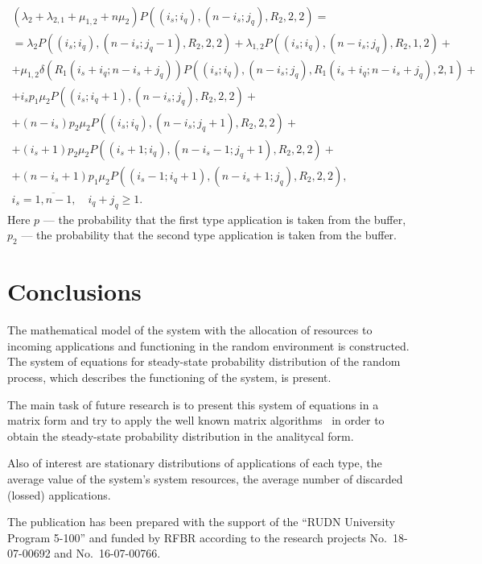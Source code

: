 {\begin{multline}
\label{eq:10.3}
\end{multline}
\begin{multline}
  \left(\lambda_2 +\lambda_{2,1}+\mu_{1,2}+n\mu_2\right)
  P\left((i_s;i_q),(n-i_s;j_q),R_2,2,2\right) = \\ =
  \lambda_2 P\left((i_s;i_q),(n-i_s;j_q-1),R_2,2,2\right) +
  \lambda_{1,2} P\left((i_s;i_q),(n-i_s;j_q),R_2,1,2\right) + \\ +
  \mu_{1,2}  \delta\left(R_1(i_s+i_q; n-i_s+j_q)\right)
  P\left((i_s;i_q),(n-i_s;j_q),R_1(i_s+i_q; n-i_s+j_q),2,1\right) + \\ +
  i_s p_1\mu_2  P\left((i_s;i_q+1),(n-i_s;j_q),R_2,2,2\right) + \\ +
  (n-i_s) p_2 \mu_2  P\left((i_s;i_q),(n-i_s;j_q+1),R_2,2,2\right) +
  \\ +
  (i_s+1) p_2 \mu_2  P\left((i_s+1;i_q),(n-i_s-1;j_q+1),R_2,2,2\right)
  + \\ +
  (n-i_s+1) p_1\mu_2 P\left((i_s-1;i_q+1),(n-i_s+1;j_q),R_2,2,2\right), \\
  i_s=\overline{1,n-1},\quad  i_q+j_q\geqslant  1.
\label{eq:10.4}
\end{multline}
Here $p$ --- the probability that the first type application is taken
from the buffer, $p_2$ --- the probability that the second type
application is taken from the buffer.



\section{Conclusions}

The mathematical model of the system with the allocation of resources
to incoming applications and functioning in the random environment is
constructed. The system of equations for steady-state probability
distribution of the random process, which describes the functioning of
the system, is present.

The main task of future research is to present this system of
equations in a matrix form and try to apply the well known matrix
algorithms~\cite{Neuts4,Neuts5,MMAP-book1,MMAP-book2,MMAP-book4} in
order to obtain the steady-state probability distribution in the
analitycal form.

Also of interest are stationary distributions of applications of each
type, the average value of the system's system resources, the average
number of discarded (lossed) applications.


\begin{acknowledgments}
The publication has been prepared with the support of the
  ``RUDN University Program 5-100'' and funded by RFBR according to
  the research projects No.~18-07-00692 and No.~16-07-00766.
\end{acknowledgments}


\putbib[cite]


} %



